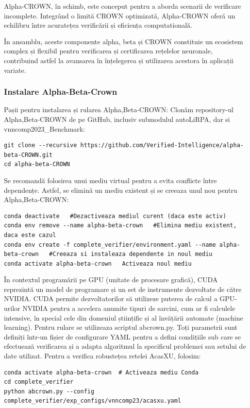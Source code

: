 \documentclass[12pt,a4paper]{article}
\begin{document}
Alpha-CROWN, în schimb, este conceput pentru a aborda scenarii de verificare incomplete. Integrând o limită CROWN optimizată, Alpha-CROWN oferă un echilibru între acuratețea verificării și eficiența computatională.

În ansamblu, aceste componente alpha, beta și CROWN constituie un ecosistem complex și flexibil pentru verificarea și certificarea rețelelor neuronale, contribuind astfel la avansarea în înțelegerea și utilizarea acestora în aplicații variate.
\subsubsection{Instalare Alpha-Beta-Crown}
Pașii pentru instalarea și rularea Alpha,Beta-CROWN:
Clonăm repository-ul Alpha,Beta-CROWN de pe GitHub, inclusiv submodulul autoLiRPA, dar si vnncomp2023\_Benchmark:
\begin{lstlisting}
git clone --recursive https://github.com/Verified-Intelligence/alpha-beta-CROWN.git
cd alpha-beta-CROWN
\end{lstlisting}
Se recomandă folosirea unui mediu virtual pentru a evita conflicte între dependențe. Astfel, se elimină un mediu existent și se creeaza unul nou pentru Alpha,Beta-CROWN:
\begin{lstlisting}
conda deactivate   #Dezactiveaza mediul curent (daca este activ)
conda env remove --name alpha-beta-crown   #Elimina mediu existent, daca este cazul
conda env create -f complete_verifier/environment.yaml --name alpha-beta-crown   #Creeaza si instaleaza dependente in noul mediu
conda activate alpha-beta-crown   Activeaza noul mediu
\end{lstlisting}
În contextul programării pe GPU (unitate de procesare grafică), CUDA reprezintă un model de programare și un set de instrumente dezvoltate de către NVIDIA. CUDA permite dezvoltatorilor să utilizeze puterea de calcul a GPU-urilor NVIDIA pentru a accelera anumite tipuri de sarcini, cum ar fi calculele intensive, în special cele din domeniul științific și al învățării automate (machine learning).
Pentru rulare se utilizeaza scriptul abcrown.py. Toți parametrii sunt definiți într-un fișier de configurare YAML pentru a defini condițiile sub care se efectuează verificarea și a adapta algoritmul la specificul problemei sau setului de date utilizat. Pentru a verifica robustețea retelei AcasXU, folosim:
\begin{lstlisting}
conda activate alpha-beta-crown  # Activeaza mediu Conda
cd complete_verifier
python abcrown.py --config complete_verifier/exp_configs/vnncomp23/acasxu.yaml
\end{lstlisting}
\end{document}
